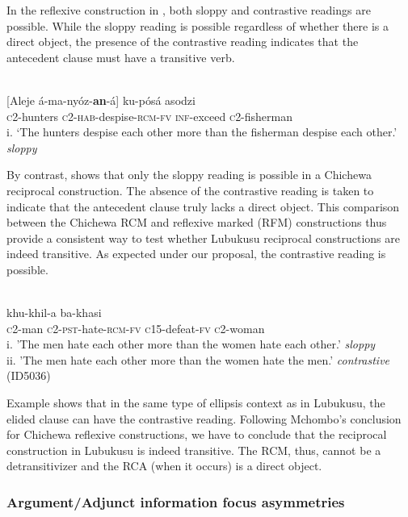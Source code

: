 \documentclass[output=paper]{langsci/langscibook}
\begin{document}
In the reflexive construction in , both sloppy and contrastive readings are possible. While the sloppy reading is possible regardless of whether there is a direct object, the presence of the contrastive reading indicates that the antecedent clause must have a transitive verb. 


\ea\label{ex:safir:12}
  \\
\gll {}[Aleje     á-ma-nyóz-\textbf{an}-á]    ku-pósá   asodzi \\
{\db}\textsc{c}2-hunters   \textsc{c2-hab}-despise-\textsc{rcm}\textsc{-fv}     \textsc{inf}-exceed   \textsc{c}2-fisherman \\
\glt
i. ‘The hunters despise each other more than the fisherman despise each other.'  \textit{sloppy}  
\z


By contrast,  shows that only the sloppy reading is possible in a Chichewa reciprocal construction. The absence of the contrastive reading is taken to indicate that the antecedent clause truly lacks a direct object. This comparison between the Chichewa RCM and reflexive marked (RFM) constructions thus provide a consistent way to test whether Lubukusu reciprocal constructions are indeed transitive. As expected under our proposal, the contrastive reading is possible.


\ea\label{ex:safir:13}
\\
   khu-khil-a   ba-khasi \\
{\db}\textsc{c}2-man   \textsc{c2-pst}-hate-\textsc{rcm}\textsc{-fv}   \textsc{c}15-defeat-\textsc{fv}   \textsc{c}2-woman  \\
\glt i. 'The men hate each other more than the women hate each other.'  \textit{sloppy} \\
\glt ii. 'The men hate each other more than the women hate the men.'  \textit{contrastive}                       (ID5036)\\
\z

Example  shows that in the same type of ellipsis context as in Lubukusu, the elided clause can have the contrastive reading. Following Mchombo's conclusion for Chichewa reflexive constructions, we have to conclude that the reciprocal construction in Lubukusu is indeed transitive. The RCM, thus, cannot be a detransitivizer and the RCA (when it occurs) is a direct object.

\subsubsection{Argument/Adjunct information focus asymmetries}
\end{document}

